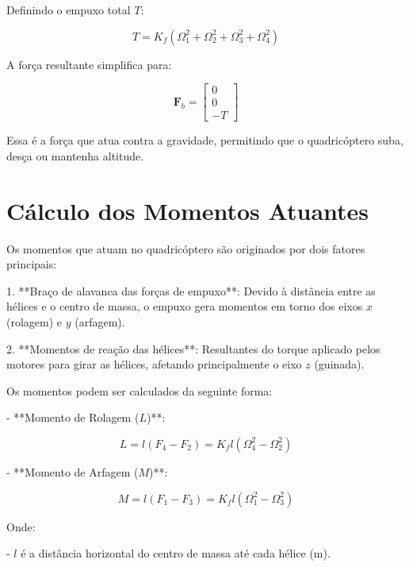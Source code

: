 Definindo o empuxo total \( T \):

\begin{equation}
T = K_f (\Omega_1^2 + \Omega_2^2 + \Omega_3^2 + \Omega_4^2)
\label{eq:empuxo_total}
\end{equation}

A força resultante simplifica para:

\begin{equation}
\mathbf{F}_b = \begin{bmatrix}
0 \\
0 \\
- T
\end{bmatrix}
\label{eq:forca_resultante_simplificada}
\end{equation}

Essa é a força que atua contra a gravidade, permitindo que o quadricóptero suba, desça ou mantenha altitude.

\section{Cálculo dos Momentos Atuantes}

Os momentos que atuam no quadricóptero são originados por dois fatores principais:

1. **Braço de alavanca das forças de empuxo**: Devido à distância entre as hélices e o centro de massa, o empuxo gera momentos em torno dos eixos \( x \) (rolagem) e \( y \) (arfagem).

2. **Momentos de reação das hélices**: Resultantes do torque aplicado pelos motores para girar as hélices, afetando principalmente o eixo \( z \) (guinada).

Os momentos podem ser calculados da seguinte forma:

- **Momento de Rolagem (\( L \))**:

\begin{equation}
L = l (F_4 - F_2) = K_f l (\Omega_4^2 - \Omega_2^2)
\label{eq:momento_rolagem}
\end{equation}

- **Momento de Arfagem (\( M \))**:

\begin{equation}
M = l (F_1 - F_3) = K_f l (\Omega_1^2 - \Omega_3^2)
\label{eq:momento_arfagem}
\end{equation}

Onde:

- \( l \) é a distância horizontal do centro de massa até cada hélice (m).

